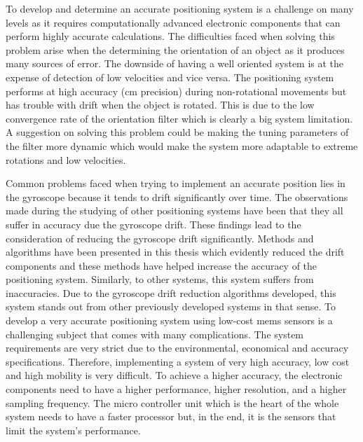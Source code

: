 To develop and determine an accurate positioning system is a challenge on many levels as it requires computationally advanced electronic components that can perform highly accurate calculations. The difficulties faced when solving this problem arise when the determining the orientation of an object as it produces many sources of error. The downside of having a well oriented system is at the expense of detection of low velocities and vice versa. The positioning system performs at high accuracy (cm precision) during non-rotational movements but has trouble with drift when the object is rotated. This is due to the low convergence rate of the orientation filter which is clearly a big system limitation. A suggestion on solving this problem could be making the tuning parameters of the filter more dynamic which would make the system more adaptable to extreme rotations and low velocities.

Common problems faced when trying to implement an accurate position lies in the gyroscope because it tends to drift significantly over time. The observations made during the studying of other positioning systems have been that they all suffer in accuracy due the gyroscope drift. These findings lead to the consideration of reducing the gyroscope drift significantly. Methods and algorithms have been presented in this thesis which evidently reduced the drift components and these methods have helped increase the accuracy of the positioning system. Similarly, to other systems, this system suffers from inaccuracies. Due to the gyroscope drift reduction algorithms developed, this system stands out from other previously developed systems in that sense. To develop a very accurate positioning system using low-cost \acrshort{mems} sensors is a challenging subject that comes with many complications. The system requirements are very strict due to the environmental, economical and accuracy specifications. Therefore, implementing a system of very high accuracy, low cost and high mobility is very difficult. To achieve a higher accuracy, the electronic components need to have a higher performance, higher resolution, and a higher sampling frequency. The micro controller unit which is the heart of the whole system needs to have a faster processor but, in the end, it is the sensors that limit the system's performance.
